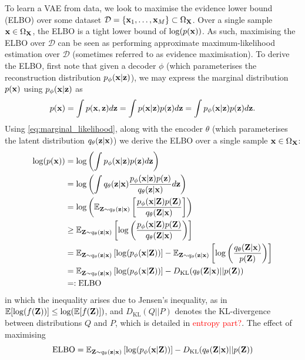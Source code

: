 \documentclass[11pt]{article}
\begin{document}
To learn a VAE from data, we look to maximise the evidence lower bound (ELBO) over some dataset $\mathcal{D}=\{\mathbf{x}_1,\dots,\mathbf{x}_M\}\subset\Omega_{\mathbf{X}}$. Over a single sample $\mathbf{x}\in\Omega_{\mathbf{X}}$, the ELBO is a tight lower bound of $\log(p(\mathbf{x}))$. As such, maximising the ELBO over $\mathcal{D}$ can be seen as performing approximate maximum-likelihood estimation over $\mathcal{D}$ (sometimes referred to as evidence maximisation). To derive the ELBO, first note that given a decoder $\phi$ (which parameterises the reconstruction distribution $p_{\phi}(\mathbf{x}|\mathbf{z})$), we may express the marginal distribution $p(\mathbf{x})$ using $p_{\phi}(\mathbf{x}|\mathbf{z})$ as
\begin{equation}
\label{eq:marginal_likelihood}
p(\mathbf{x})
=
\int p(\mathbf{x},\mathbf{z})d\mathbf{z}
=
\int p(\mathbf{x}|\mathbf{z})p(\mathbf{z})d\mathbf{z}
=
\int p_{\phi}(\mathbf{x}|\mathbf{z})p(\mathbf{z})d\mathbf{z}.
\end{equation}
Using \autoref{eq:marginal_likelihood}, along with the encoder $\theta$ (which parameterises the latent distribution $q_{\theta}(\mathbf{z}|\mathbf{x})$) we derive the ELBO over a single sample $\mathbf{x}\in\Omega_{\mathbf{X}}$:
\begin{align*}
    \log(p(\mathbf{x}))
    &=
    \log\left(\int p_{\phi}(\mathbf{x}|\mathbf{z})p(\mathbf{z})d\mathbf{z}\right)\\
    &=
    \log\left(\int q_{\theta}(\mathbf{z}|\mathbf{x})\frac{p_{\phi}(\mathbf{x}|\mathbf{z})p(\mathbf{z})}{q_{\theta}(\mathbf{z}|\mathbf{x})}d\mathbf{z}\right)\\
    &=
    \log\left(\mathbb{E}_{\mathbf{Z}\sim q_{\theta}(\mathbf{z}|\mathbf{x})}\left[\frac{p_{\phi}(\mathbf{x}|\mathbf{Z})p(\mathbf{Z})}{q_{\theta}(\mathbf{Z}|\mathbf{x})}\right]\right)\\
    &\geq
    \mathbb{E}_{\mathbf{Z}\sim q_{\theta}(\mathbf{z}|\mathbf{x})}\left[\log\left(\frac{p_{\phi}(\mathbf{x}|\mathbf{Z})p(\mathbf{Z})}{q_{\theta}(\mathbf{Z}|\mathbf{x})}\right)\right]\\
    &=
    \mathbb{E}_{\mathbf{Z}\sim q_{\theta}(\mathbf{z}|\mathbf{x})}\left[\log(p_{\phi}(\mathbf{x}|\mathbf{Z}))\right]-\mathbb{E}_{\mathbf{Z}\sim q_{\theta}(\mathbf{z}|\mathbf{x})}\left[\log\left(\frac{q_{\theta}(\mathbf{Z}|\mathbf{x})}{p(\mathbf{Z})}\right)\right]\\
    &=
    \mathbb{E}_{\mathbf{Z}\sim q_{\theta}(\mathbf{z}|\mathbf{x})}\left[\log(p_{\phi}(\mathbf{x}|\mathbf{Z}))\right]-D_{\text{KL}}(q_{\theta}(\mathbf{Z}|\mathbf{x})||p(\mathbf{Z}))\\
    &=:
    \text{ELBO}
\end{align*}
in which the inequality arises due to Jensen's inequality, as in $\mathbb{E}[\log(f(\mathbf{Z}))]\leq\log(\mathbb{E}[f(\mathbf{Z})])$, and $D_\text{KL}(Q||P)$ denotes the KL-divergence between distributions $Q$ and $P$, which is detailed in \textcolor{red}{entropy part?}. The effect of maximising
$$
\text{ELBO}
=
\mathbb{E}_{\mathbf{Z}\sim q_{\theta}(\mathbf{z}|\mathbf{x})}\left[\log(p_{\phi}(\mathbf{x}|\mathbf{Z}))\right]-D_{\text{KL}}(q_{\theta}(\mathbf{Z}|\mathbf{x})||p(\mathbf{Z}))
$$
\end{document}

